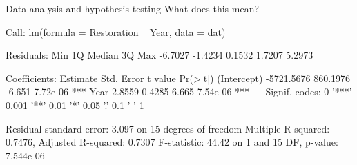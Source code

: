 \documentclass[xcolor=svgnames]{beamer}
\begin{document}
\begin{frame}[fragile]{Data analysis and hypothesis testing}
What does this mean?
\vspace{0.1in}
\scriptsize
\begin{Schunk}
\begin{Soutput}
Call:
lm(formula = Restoration ~ Year, data = dat)

Residuals:
    Min      1Q  Median      3Q     Max 
-6.7027 -1.4234  0.1532  1.7207  5.2973 

Coefficients:
              Estimate Std. Error t value Pr(>|t|)    
(Intercept) -5721.5676   860.1976  -6.651 7.72e-06 ***
Year            2.8559     0.4285   6.665 7.54e-06 ***
---
Signif. codes:  0 '***' 0.001 '**' 0.01 '*' 0.05 '.' 0.1 ' ' 1

Residual standard error: 3.097 on 15 degrees of freedom
Multiple R-squared:  0.7476,	Adjusted R-squared:  0.7307 
F-statistic: 44.42 on 1 and 15 DF,  p-value: 7.544e-06
\end{Soutput}
\end{Schunk}
\end{frame}
\end{document}
